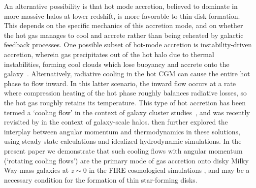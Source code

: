 \documentclass[fleqn,usenatbib]{mnras}
\begin{document}
An alternative possibility is that hot mode accretion, believed to dominate in more massive halos at lower redshift, is more favorable to thin-disk formation.
This depends on the specific mechanics of this accretion mode, and on whether the hot gas manages to cool and accrete rather than being reheated by galactic feedback processes.
One possible subset of hot-mode accretion is instability-driven accretion, wherein gas precipitates out of the hot halo due to thermal instabilities, forming cool clouds which lose buoyancy and accrete onto the galaxy~\citep[e.g.][]{Maller2004, Mccourt2012, Voit2015, Armillotta2016, Gronke2020b, Voit2021}.
Alternatively, radiative cooling in the hot CGM can cause the entire hot phase to flow inward.
In this latter scenario, the inward flow occurs at a rate where compression heating of the hot phase roughly balances radiative losses, so the hot gas roughly retains its temperature.
This type of hot accretion has been termed a `cooling flow' in the context of galaxy cluster studies~\citep[][see \citealt{McNamara2007} for a review]{Mathews1978, Cowie1980, Fabian1984, Balbus1988, Bertschinger1989}, and was recently revisited by 
\cite{Stern2019} in the context of galaxy-scale halos.
\cite{Stern2020} then further explored the interplay between angular momentum and thermodynamics in these solutions, using steady-state calculations and idealized hydrodynamic simulations. 
In the present paper we demonstrate that such cooling flows with angular momentum (`rotating cooling flows')
are the primary mode of gas accretion onto disky Milky Way-mass galaxies at $z \sim 0$ in the FIRE cosmological simulations \citep{Hopkins2018}, and may be a necessary condition for the formation of thin star-forming disks.
\end{document}
